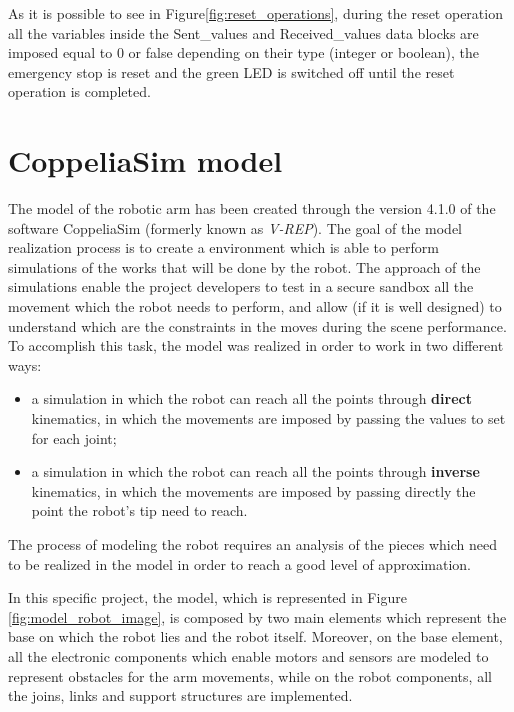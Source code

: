 As it is possible to see in Figure\ref{fig:reset_operations}, during the reset operation all the variables inside the Sent\_values and Received\_values data blocks are imposed equal to 0 or false depending on their type (integer or boolean), the emergency stop is reset and the green LED is switched off until the reset operation is completed.

\newpage
\section{CoppeliaSim model}

The model of the robotic arm has been created through the version 4.1.0 of the software CoppeliaSim (formerly known as \textit{V-REP}). 
The goal of the model realization process is to create a environment which is able to perform simulations of the works that will be done by the robot. The approach of the simulations enable the project developers to test in a secure sandbox all the movement which the robot needs to perform, and allow (if it is well designed) to understand which are the constraints in the moves during the scene performance.
To accomplish this task, the model was realized in order to work in two different ways:
\begin{itemize}
    \item a simulation in which the robot can reach all the points through \textbf{direct} kinematics, in which the movements are imposed by passing the values to set for each joint;
    \item a simulation in which the robot can reach all the points through \textbf{inverse} kinematics, in which the movements are imposed by passing directly the point the robot's tip need to reach.
\end{itemize}
The process of modeling the robot requires an analysis of the pieces which need to be realized in the model in order to reach a good level of approximation. 

In this specific project, the model, which is represented in Figure \ref{fig:model_robot_image}, is composed by two main elements which represent the base on which the robot lies and the robot itself. Moreover, on the base element, all the electronic components which enable motors and sensors are modeled to represent obstacles for the arm movements, while on the robot components, all the joins, links and support structures are implemented.

